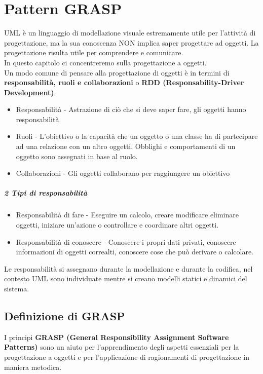 \chapter{Pattern GRASP}
UML è un linguaggio di modellazione visuale estremamente utile per l'attività di progettazione,
ma la sua conoscenza NON implica saper progettare ad oggetti. La progettazione risulta utile
per comprendere e comunicare.
\\ In questo capitolo ci concentreremo sulla progettazione a oggetti.
\\ Un modo comune di pensare alla progettazione di oggetti è in termini di
\textbf{responsabilità, ruoli e collaborazioni} o \textbf{RDD (Responsability-Driver
Development)}.
\begin{itemize}
    \item Responsabilità - Astrazione di ciò che si deve saper fare, gli oggetti hanno responsabilità
    \item Ruoli - L'obiettivo o la capacità che un oggetto o una classe ha di partecipare ad una
    relazione con un altro oggetti. Obblighi e comportamenti di un oggetto sono assegnati in
    base al ruolo.
    \item Collaborazioni - Gli oggetti collaborano per raggiungere un obiettivo
\end{itemize}
\paragraph*{2 Tipi di responsabilità}
\begin{itemize}
    \item Responsabilità di fare - Eseguire un calcolo, creare modificare eliminare oggetti, 
    iniziare un'azione o controllare e coordinare altri oggetti.
    \item Responsabilità di conoscere - Conoscere i propri dati privati, conoscere informazioni
    di oggetti correalti, conoscere cose che può derivare o calcolare.
\end{itemize}
Le responsabilità si assegnano durante la modellazione e durante la codifica, nel contesto
UML sono individuate mentre si creano modelli statici e dinamici del sistema.
\section{Definizione di GRASP}
I principi \textbf{GRASP (General Responsibility Assignment Software Patterns)} sono un aiuto
per l'apprendimento degli aspetti essenziali per la progettazione a oggetti e per
l'applicazione di ragionamenti di progettazione in maniera metodica.

